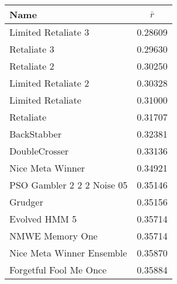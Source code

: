 \begin{tabular}{lc}
\toprule
Name                       &    $\bar{r}$ \\
\midrule
Limited Retaliate 3        &          0.28609 \\
Retaliate 3                &          0.29630 \\
Retaliate 2                &          0.30250 \\
Limited Retaliate 2        &          0.30328 \\
Limited Retaliate          &          0.31000 \\
Retaliate                  &          0.31707 \\
BackStabber                &          0.32381 \\
DoubleCrosser              &          0.33136 \\
Nice Meta Winner           &          0.34921 \\
PSO Gambler 2 2 2 Noise 05 &          0.35146 \\
Grudger                    &          0.35156 \\
Evolved HMM 5              &          0.35714 \\
NMWE Memory One            &          0.35714 \\
Nice Meta Winner Ensemble  &          0.35870 \\
Forgetful Fool Me Once     &          0.35884 \\
\bottomrule
\end{tabular}
